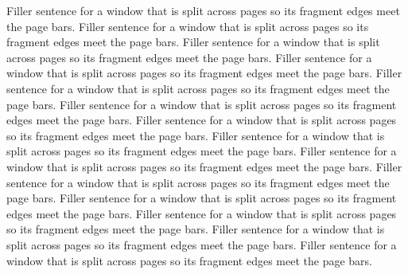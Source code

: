 \documentclass[type=report,theme=light,language=en]{semio}
\begin{document}
\begin{Blockquote}[title={Split Across Pages}]
Filler sentence for a window that is split across pages so its fragment edges meet the page bars. Filler sentence for a window that is split across pages so its fragment edges meet the page bars. Filler sentence for a window that is split across pages so its fragment edges meet the page bars. Filler sentence for a window that is split across pages so its fragment edges meet the page bars. Filler sentence for a window that is split across pages so its fragment edges meet the page bars. Filler sentence for a window that is split across pages so its fragment edges meet the page bars. Filler sentence for a window that is split across pages so its fragment edges meet the page bars. Filler sentence for a window that is split across pages so its fragment edges meet the page bars. Filler sentence for a window that is split across pages so its fragment edges meet the page bars. Filler sentence for a window that is split across pages so its fragment edges meet the page bars. Filler sentence for a window that is split across pages so its fragment edges meet the page bars. Filler sentence for a window that is split across pages so its fragment edges meet the page bars. Filler sentence for a window that is split across pages so its fragment edges meet the page bars. Filler sentence for a window that is split across pages so its fragment edges meet the page bars. 
\end{Blockquote}
\end{document}
